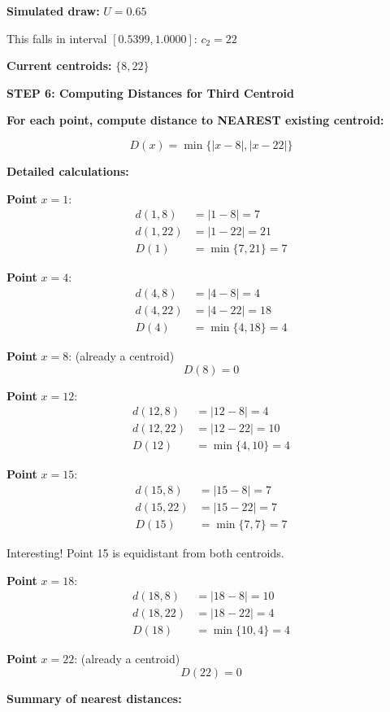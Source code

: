 \documentclass[12pt]{article}
\begin{document}
\begin{solution}
\textbf{Simulated draw:} $U = 0.65$

This falls in interval $[0.5399, 1.0000]$: $c_2 = 22$

\textbf{Current centroids:} $\{8, 22\}$

\textbf{STEP 6: Computing Distances for Third Centroid}

\textbf{For each point, compute distance to NEAREST existing centroid:}

\[
D(x) = \min\{|x - 8|, |x - 22|\}
\]

\textbf{Detailed calculations:}

\textbf{Point } $x=1$:
\begin{align*}
d(1, 8) &= |1 - 8| = 7 \\
d(1, 22) &= |1 - 22| = 21 \\
D(1) &= \min\{7, 21\} = 7
\end{align*}

\textbf{Point } $x=4$:
\begin{align*}
d(4, 8) &= |4 - 8| = 4 \\
d(4, 22) &= |4 - 22| = 18 \\
D(4) &= \min\{4, 18\} = 4
\end{align*}

\textbf{Point } $x=8$: (already a centroid)
\[
D(8) = 0
\]

\textbf{Point } $x=12$:
\begin{align*}
d(12, 8) &= |12 - 8| = 4 \\
d(12, 22) &= |12 - 22| = 10 \\
D(12) &= \min\{4, 10\} = 4
\end{align*}

\textbf{Point } $x=15$:
\begin{align*}
d(15, 8) &= |15 - 8| = 7 \\
d(15, 22) &= |15 - 22| = 7 \\
D(15) &= \min\{7, 7\} = 7
\end{align*}

Interesting! Point 15 is equidistant from both centroids.

\textbf{Point } $x=18$:
\begin{align*}
d(18, 8) &= |18 - 8| = 10 \\
d(18, 22) &= |18 - 22| = 4 \\
D(18) &= \min\{10, 4\} = 4
\end{align*}

\textbf{Point } $x=22$: (already a centroid)
\[
D(22) = 0
\]

\textbf{Summary of nearest distances:}


\end{solution}
\end{document}
